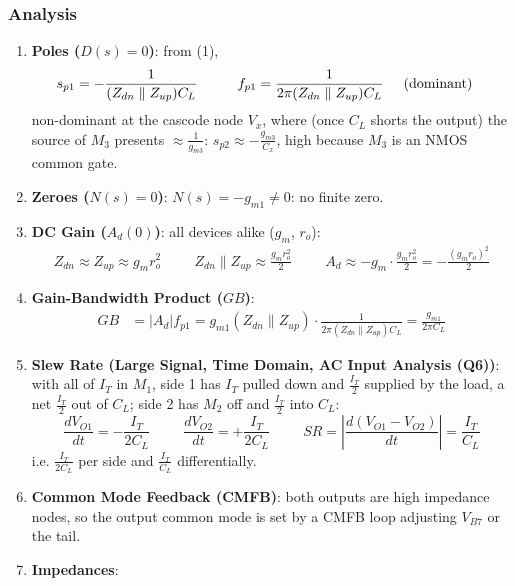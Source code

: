 \subsubsection{Analysis}
\begin{enumerate}
  \item \textbf{Poles (\(D(s) = 0\))}: from (1),
    \begin{align*}
      s_{p1} &= -\frac{1}{(Z_{dn} \parallel Z_{up}) C_L} \hspace{1cm} f_{p1} = \frac{1}{2\pi (Z_{dn} \parallel Z_{up}) C_L} \hspace{0.5cm} \text{(dominant)}
    \end{align*}
    non-dominant at the cascode node \(V_x\), where (once \(C_L\) shorts the output) the source
    of \(M_3\) presents \(\approx \frac{1}{g_{m3}}\): \(s_{p2} \approx -\frac{g_{m3}}{C_x}\), high because \(M_3\) is an
    NMOS common gate.
  \item \textbf{Zeroes (\(N(s) = 0\))}: \(N(s) = -g_{m1} \neq 0\): no finite zero.
  \item \textbf{DC Gain (\(A_d(0)\))}: all devices alike (\(g_m\), \(r_o\)):
    \begin{align*}
      Z_{dn} \approx Z_{up} \approx g_m r_o^2 \hspace{1cm} Z_{dn} \parallel Z_{up} \approx \frac{g_m r_o^2}{2} \hspace{1cm}
      A_d \approx -g_m \cdot \frac{g_m r_o^2}{2} = -\frac{(g_m r_o)^2}{2}
    \end{align*}
  \item \textbf{Gain-Bandwidth Product (\(GB\))}:
    \begin{align*}
      GB &= |A_d| f_{p1} = g_{m1}(Z_{dn} \parallel Z_{up})\cdot\frac{1}{2\pi (Z_{dn} \parallel Z_{up}) C_L} = \frac{g_{m1}}{2\pi C_L}
    \end{align*}
  \item \textbf{Slew Rate (Large Signal, Time Domain, AC Input Analysis (Q6))}: with all of \(I_T\) in \(M_1\), side 1 has \(I_T\)
    pulled down and \(\frac{I_T}{2}\) supplied by the load, a net \(\frac{I_T}{2}\)
    out of \(C_L\); side 2 has \(M_2\) off and \(\frac{I_T}{2}\) into \(C_L\):
    \[
      \frac{dV_{O1}}{dt} = -\frac{I_T}{2 C_L} \hspace{1cm}
      \frac{dV_{O2}}{dt} = +\frac{I_T}{2 C_L} \hspace{1cm}
      SR = \left|\frac{d(V_{O1} - V_{O2})}{dt}\right| = \frac{I_T}{C_L}
    \]
    i.e. \(\frac{I_T}{2 C_L}\) per side and \(\frac{I_T}{C_L}\) differentially.
  \item \textbf{Common Mode Feedback (CMFB)}: both outputs are high impedance nodes, so
    the output common mode is set by a CMFB loop adjusting \(V_{B7}\) or the tail.
  \item \textbf{Impedances}:

\end{enumerate}

